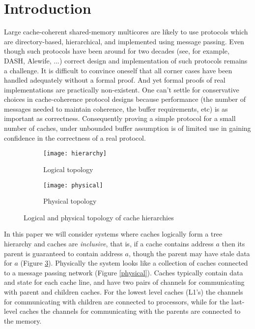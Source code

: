 \section{Introduction} 

Large cache-coherent shared-memory multicores are likely to use protocols which
are directory-based, hierarchical, and implemented using message passing.  Even
though such protocols have been around for two decades (see, for example,
DASH\cite{DASH}, Alewife\cite{Anant}, ...) correct design and implementation of
such protocols remains a challenge. It is difficult to convince oneself that
all corner cases have been handled adequately without a formal proof. And yet
formal proofs of real implementations are practically non-existent. One can't
settle for conservative choices in cache-coherence protocol designs because
performance (\eg the number of messages needed to maintain coherence, the
buffer requirements, etc) is as important as correctness. Consequently proving
a simple protocol for a small number of caches, under unbounded buffer
assumption is of limited use in gaining confidence in the correctness of a real
protocol. 

\begin{figure}
\centering
\begin{subfigure}{.45\linewidth}
\centering
\texttt{[image: hierarchy]}
\caption{Logical topology}
\label{hierarchy}
\end{subfigure}
\begin{subfigure}{.45\linewidth}
\centering
\texttt{[image: physical]}
\caption{Physical topology}
\label{hierarchy}
\end{subfigure}
\caption{Logical and physical topology of cache hierarchies}
\end{figure}

In this paper we will consider systems where caches logically form a tree
hierarchy and caches are \emph{inclusive}, that is, if a cache contains address
$a$ then its parent is guaranteed to contain address $a$, though the parent may
have stale data for $a$ (Figure \ref{hierarchy}). Physically the system looks
like a collection of caches connected to a message passing network (Figure
\ref{physical}). Caches typically contain data and state for each cache line,
and have two pairs of channels for communicating with parent and children
caches. For the lowest level caches (L1's) the channels for communicating with
children are connected to processors, while for the last-level caches the
channels for communicating with the parents are connected to the memory. 

